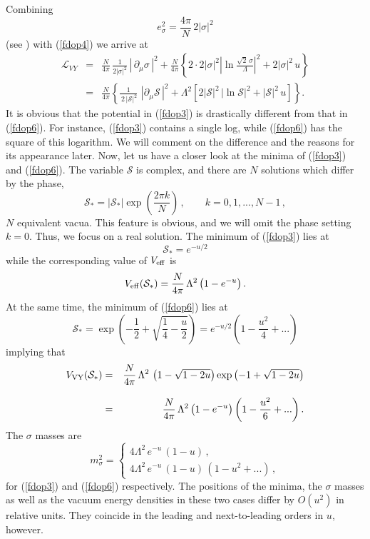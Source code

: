 \documentclass[epsfig,12pt]{article}
\def\beq{\begin{equation}}
\def\eeq{\end{equation}}
\def\beqn{\begin{eqnarray}}
\def\eeqn{\end{eqnarray}}
\newcommand{\cs}{{\mathcal S}}
\def\beqn{\begin{eqnarray}}
\def\eeqn{\end{eqnarray}}
\def\beq{\begin{equation}}
\def\eeq{\end{equation}}
\begin{document}
{Combining 
\beq
e^2_\sigma =\frac{4\pi}{N}\,2|\sigma|^2
\label{fdop5} 
\eeq
(see \cite{SYhet}) with (\ref{fdop4}) we arrive at
\beqn
{\mathcal L}_{VY} 
&=&\frac{N}{4\pi}\,\frac{1}{2|\sigma|^2}\,| \,  \partial_\mu\sigma \,|^2+
 \frac{N}{4\pi}
\left\{ 2\cdot 2|\sigma|^2
 \left|
\ln\frac{\sqrt{2}\, \sigma}{\Lambda}\right|^2
+2|\sigma|^2\, u\right\}
\nonumber\\[3mm]
&=& \frac{N}{4\pi}
\left\{
\frac{1}{\,2\, |\cs|^2}\,\,
 | \partial_\mu\cs \, |^2
 +\Lambda^2
 \left[2|\cs |^2\,\left|\ln \cs\right|^2 + |\cs|^2\,u
 \right]
 \right\}.
 \label{fdop6}
\eeqn
It is obvious that the potential in (\ref{fdop3})
is drastically different from that in (\ref{fdop6}). 
For instance, (\ref{fdop3}) contains a single log, while (\ref{fdop6}) has the square of this logarithm.
We will comment on the difference and the reasons for its appearance 
later. Now, let us have a closer look at the minima of
(\ref{fdop3}) and (\ref{fdop6}). The variable $\cs$ is complex, and there are $N$ solutions
which differ by the phase,
\beq
\cs_* = \left|\cs_* \right|\exp\left(\frac{2\pi k}{N}\right)\,,\qquad k = 0,1, ..., N-1\,,
\eeq
$N$ equivalent vacua. This feature is obvious, and we will omit the phase setting $k=0$.
Thus, we focus on a real solution.
The minimum of (\ref{fdop3}) lies at
 \beq
 \cs_* = e^{-u/2}
 \label{wdop1}
 \eeq
while the corresponding value of $V_{\rm eff}$ is
\beq
V_{\rm eff} (\cs_* ) = \frac{N}{4\pi}\,\Lambda^2 \left(1- e^{-u}
\right)  .
 \label{wdop2}
\eeq
At the same time, the minimum of (\ref{fdop6}) lies at
\beq
\cs_* = \exp\left(-\frac{1}{2} + \sqrt{\frac{1}{4}-\frac{u}{2}}\right) =  e^{-u/2}\left(1-\frac{u^2}{4} + ...
\right)
\label{wdop3}
\eeq
implying that 
\beqn
V_{\rm VY} (\cs_* )
&=&  \frac{N}{4\pi}\,\Lambda^2 \,\left({1} - \sqrt{{1}-2 {u}} \right)\exp\left(-{1} + \sqrt{{1}-2 {u}}\right)
\nonumber\\[3mm]
& =&
  \frac{N}{4\pi}\,\Lambda^2 \left(1- e^{-u}
\right) \left(1-\frac{u^2}{6}  + ...
\right) .
\label{wdop5}
\eeqn 
The $\sigma$ masses are
\beq
m_\sigma^2 = \left\{
\begin{array}{l}
4\Lambda^2\,e^{-u}\,(1-u)\,,\\[2mm]
4\Lambda^2\,e^{-u}\,(1-u)\,(1-u^2+...)\,,
\end{array}
\right.
\label{wdop4}
\eeq
for (\ref{fdop3}) and (\ref{fdop6}) respectively.
The positions of the minima, the $\sigma$ masses
as well as the vacuum energy densities in these two cases
differ by $O(u^2)$ in relative units. They coincide in the leading and next-to-leading orders in $u$, however.

}
\end{document}
